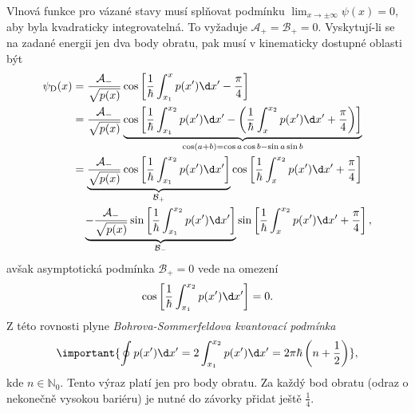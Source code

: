 Vlnová funkce pro vázané stavy musí splňovat podmínku $\lim_{x\rightarrow\pm\infty}\psi(x)=0$, aby byla kvadraticky integrovatelná.
To vyžaduje $\mathcal{A}_{+}=\mathcal{B}_{+}=0$.
Vyskytují-li se na zadané energii jen dva body obratu, pak musí v kinematicky dostupné oblasti být 
\begin{align}
    \psi_{\mathrm{D}}(x)
        &=\frac{\mathcal{A}_{-}}{\sqrt{p(x)}}\cos\left[\frac{1}{\hbar}\int_{x_{1}}^{x}p(x')\d x'-\frac{\pi}{4}\right]\nonumber\\
        &=\frac{\mathcal{A}_{-}}{\sqrt{p(x)}}\underbrace{\cos\left[\frac{1}{\hbar}\int_{x_{1}}^{x_{2}}p(x')\d x'-\left(\frac{1}{\hbar}\int_{x}^{x_{2}}p(x')\d x'+\frac{\pi}{4}\right)\right]}_{\cos\left(a+b\right)=\cos{a}\cos{b}-\sin{a}\sin{b}}\nonumber\\
        &=\underbrace{\frac{\mathcal{A}_{-}}{\sqrt{p(x)}}\cos\left[\frac{1}{\hbar}\int_{x_{1}}^{x_{2}}p(x')\d x'\right]}_{\mathcal{B}_{+}}\cos\left[\frac{1}{\hbar}\int_{x}^{x_{2}}p(x')\d x'+\frac{\pi}{4}\right]\nonumber\\
        &\quad\underbrace{-\frac{\mathcal{A}_{-}}{\sqrt{p(x)}}\sin\left[\frac{1}{\hbar}\int_{x_{1}}^{x_{2}}p(x')\d x'\right]}_{\mathcal{B_{-}}}\sin\left[\frac{1}{\hbar}\int_{x}^{x_{2}}p(x')\d x'+\frac{\pi}{4}\right],
\end{align}
avšak asymptotická podmínka $\mathcal{B}_{+}=0$ vede na omezení
\begin{equation}
    \cos\left[\frac{1}{\hbar}\int_{x_{1}}^{x_{2}}p(x')\d x'\right]=0.
\end{equation}
Z této rovnosti plyne \emph{Bohrova-Sommerfeldova kvantovací podmínka}
\begin{equation}
    \label{eq:BohrSommerfeld}
    \important{\oint p(x')\d x'=2\int_{x_{1}}^{x_{2}}p(x')\d x'=2\pi\hbar\left(n+\frac{1}{2}\right)},
\end{equation}
kde $n\in\mathbb{N}_{0}$.	
Tento výraz platí jen pro  body obratu.
Za každý  bod obratu (odraz o nekonečně vysokou bariéru) je nutné do závorky přidat ještě $\frac{1}{4}$.

